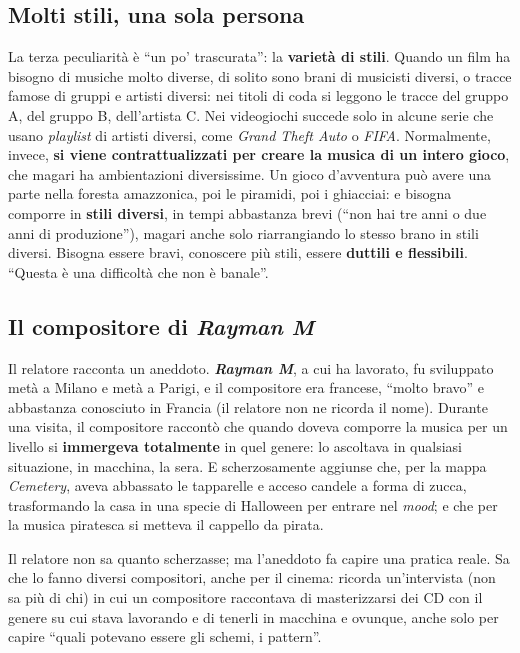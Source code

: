 \subsection{Molti stili, una sola persona}

La terza peculiarità è ``un po' trascurata'': la \textbf{varietà di stili}. Quando
un film ha bisogno di musiche molto diverse, di solito sono brani di musicisti
diversi, o tracce famose di gruppi e artisti diversi: nei titoli di coda si
leggono le tracce del gruppo A, del gruppo B, dell'artista C. Nei videogiochi
succede solo in alcune serie che usano \emph{playlist} di artisti diversi, come
\emph{Grand Theft Auto} o \emph{FIFA}. Normalmente, invece, \textbf{si viene
contrattualizzati per creare la musica di un intero gioco}, che magari ha
ambientazioni diversissime. Un gioco d'avventura può avere una parte nella
foresta amazzonica, poi le piramidi, poi i ghiacciai: e bisogna comporre in
\textbf{stili diversi}, in tempi abbastanza brevi (``non hai tre anni o due anni
di produzione''), magari anche solo riarrangiando lo stesso brano in stili
diversi. Bisogna essere bravi, conoscere più stili, essere \textbf{duttili e
flessibili}. ``Questa è una difficoltà che non è banale''.

\subsection{Il compositore di \emph{Rayman M}}

Il relatore racconta un aneddoto. \textbf{\emph{Rayman M}}, a cui ha lavorato, fu
sviluppato metà a Milano e metà a Parigi, e il compositore era francese, ``molto
bravo'' e abbastanza conosciuto in Francia (il relatore non ne ricorda il nome).
Durante una visita, il compositore raccontò che quando doveva comporre la musica
per un livello si \textbf{immergeva totalmente} in quel genere: lo ascoltava in
qualsiasi situazione, in macchina, la sera. E scherzosamente aggiunse che, per la
mappa \emph{Cemetery}, aveva abbassato le tapparelle e acceso candele a forma di
zucca, trasformando la casa in una specie di Halloween per entrare nel
\emph{mood}; e che per la musica piratesca si metteva il cappello da pirata.

Il relatore non sa quanto scherzasse; ma l'aneddoto fa capire una pratica reale.
Sa che lo fanno diversi compositori, anche per il cinema: ricorda un'intervista
(non sa più di chi) in cui un compositore raccontava di masterizzarsi dei CD con
il genere su cui stava lavorando e di tenerli in macchina e ovunque, anche solo
per capire ``quali potevano essere gli schemi, i pattern''.

